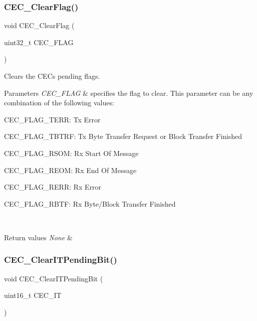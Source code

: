 \subsubsection{\texorpdfstring{CEC\_ClearFlag()}{CEC\_ClearFlag()}}
{\footnotesize\ttfamily void C\+E\+C\+\_\+\+Clear\+Flag (\begin{DoxyParamCaption}\item[{uint32\+\_\+t}]{C\+E\+C\+\_\+\+F\+L\+AG }\end{DoxyParamCaption})}



Clears the C\+EC\textquotesingle{}s pending flags. 


\begin{DoxyParams}{Parameters}
{\em C\+E\+C\+\_\+\+F\+L\+AG} & specifies the flag to clear. This parameter can be any combination of the following values\+: \begin{DoxyItemize}
\item C\+E\+C\+\_\+\+F\+L\+A\+G\+\_\+\+T\+E\+RR\+: Tx Error \item C\+E\+C\+\_\+\+F\+L\+A\+G\+\_\+\+T\+B\+T\+RF\+: Tx Byte Transfer Request or Block Transfer Finished \item C\+E\+C\+\_\+\+F\+L\+A\+G\+\_\+\+R\+S\+OM\+: Rx Start Of Message \item C\+E\+C\+\_\+\+F\+L\+A\+G\+\_\+\+R\+E\+OM\+: Rx End Of Message \item C\+E\+C\+\_\+\+F\+L\+A\+G\+\_\+\+R\+E\+RR\+: Rx Error \item C\+E\+C\+\_\+\+F\+L\+A\+G\+\_\+\+R\+B\+TF\+: Rx Byte/\+Block Transfer Finished \end{DoxyItemize}
\\
\hline
\end{DoxyParams}

\begin{DoxyRetVals}{Return values}
{\em None} & \\
\hline
\end{DoxyRetVals}
\mbox{\label{group___c_e_c___private___functions_gade646921262a077172c708953822f248}} 
\subsubsection{\texorpdfstring{CEC\_ClearITPendingBit()}{CEC\_ClearITPendingBit()}}
{\footnotesize\ttfamily void C\+E\+C\+\_\+\+Clear\+I\+T\+Pending\+Bit (\begin{DoxyParamCaption}\item[{uint16\+\_\+t}]{C\+E\+C\+\_\+\+IT }\end{DoxyParamCaption})}



